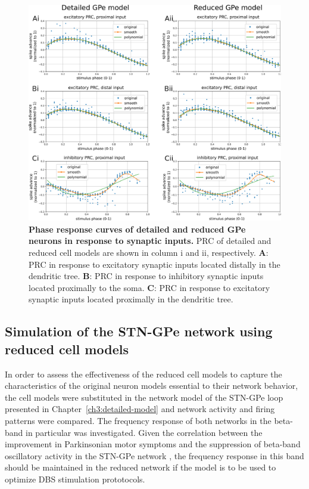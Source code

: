 \begin{figure}[ht]
\centering
\includegraphics[width=\textwidth]{ch_reduced_model/figs/fig_gpe-full-vs-red_PRC-curves.png}
\caption{\textbf{Phase response curves of detailed and reduced GPe neurons in response to synaptic inputs.}
PRC of detailed and reduced cell models are shown in column i and ii, respectively.
\textbf{A}: PRC in response to excitatory synaptic inputs located distally in the dendritic tree.
\textbf{B}: PRC in response to inhibitory synaptic inputs located proximally to the soma.
\textbf{C}: PRC in response to excitatory synaptic inputs located proximally in the dendritic tree.}
\label{fig:gpe-full-vs-red_PRC-curves}
\end{figure}

%
%
%
%

%
%
%
\subsection{Simulation of the STN-GPe network using reduced cell models}
%

%
%

In order to assess the effectiveness of the reduced cell models to capture
the characteristics of the original neuron models essential to their
network behavior, the cell models were substituted in the network model of the
STN-GPe loop presented in Chapter~\ref{ch3:detailed-model} and network activity
and firing patterns were compared. The frequency response of both networks
in the beta-band in particular was investigated. Given the correlation
between the improvement in Parkinsonian motor symptoms and the suppression
of beta-band oscillatory activity in the STN-GPe network
\cite{kuhn_reduction_2006,weinberger_beta_2006,eusebio_deep_2011,ray_local_2008},
the frequency response in this band should be maintained in the reduced network if the model is
to be used to optimize DBS stimulation prototocols.

